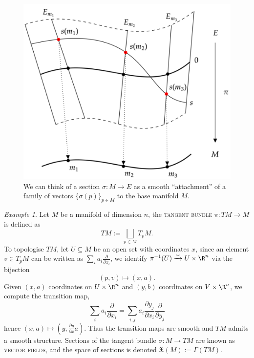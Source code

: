 \documentclass[reqno]{amsart}
\theoremstyle{definition}
\theoremstyle{remark}
\newtheorem*{example}{Example}
\renewcommand{\emph}{\textsc}
\begin{document}
	\begin{figure}[h]
	\begin{center}
		\includegraphics[scale = 0.5]{section}
		\caption{We can think of a section $\sigma : M \to E$ as a smooth ``attachment'' of a family of vectors $\{\sigma (p)\}_{p \in M}$ to the base manifold $M$.}
	\end{center}	
\end{figure}

\begin{example}
	Let $M$ be a manifold of dimension $n$, the \emph{tangent bundle} $\pi : TM \to M$ is defined as
		\[ TM := \bigsqcup_{p \in M} T_p M. \]
	To topologise $TM$, let $U \subseteq M$ be an open set with coordinates $x$, since an element $v \in T_p M$ can be written as $\sum_i a_i \tfrac{\partial}{\partial x_i}$, we identify $\pi^{-1} (U) \xrightarrow{\sim} U \times \R^n$ via the bijection
		\[ (p, v) \mapsto (x, a). \]
	Given $(x, a)$ coordinates on $	U \times \R^n$ and $(y, b)$ coordinates on $V \times \R^n$, we compute the transition map,
		\[ \sum_i a_i \frac{\partial}{\partial x_i} = \sum_{i, j} a_i \frac{\partial y_j}{\partial x_i} \frac{\partial}{\partial y_j} \]	
	hence $(x, a) \mapsto (y, \frac{\partial y}{\partial x} a)$. Thus the transition maps are smooth and $TM$ admits a smooth structure. Sections of the tangent bundle $\sigma : M \to TM$ are known as \emph{vector fields}, and the space of sections is denoted $\mathfrak X(M) := \Gamma (TM)$. 
\end{example}
\end{document}
